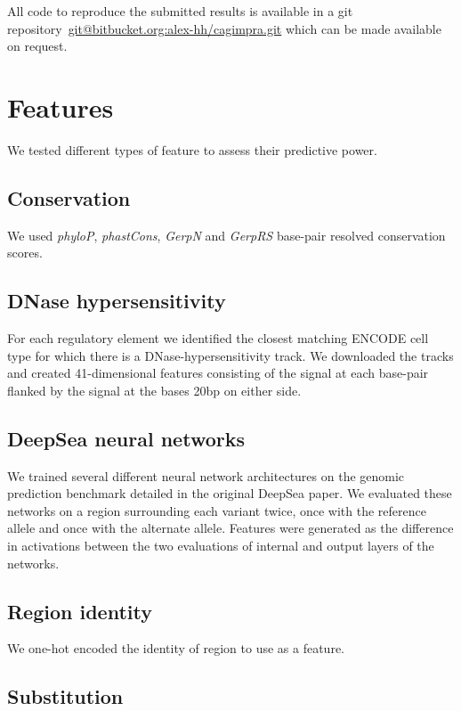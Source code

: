 \documentclass{article}
\begin{document}
All code to reproduce the submitted results is available in a git
repository~\url{git@bitbucket.org:alex-hh/cagimpra.git} which can be made
available on request.


\section*{Features}

We tested different types of feature to assess their predictive power.


\subsection*{Conservation}

We used \emph{phyloP}, \emph{phastCons}, \emph{GerpN} and \emph{GerpRS}
base-pair resolved conservation scores.


\subsection*{DNase hypersensitivity}

For each regulatory element we identified the closest matching ENCODE cell type
for which there is a DNase-hypersensitivity track. We downloaded the tracks and
created 41-dimensional features consisting of the signal at each base-pair
flanked by the signal at the bases 20bp on either side.


\subsection*{DeepSea neural networks}

We trained several different neural network architectures on the genomic
prediction benchmark detailed in the original DeepSea paper. We evaluated these
networks on a region surrounding each variant twice, once with the reference
allele and once with the alternate allele. Features were generated as the
difference in activations between the two evaluations of internal and output
layers of the networks.


\subsection*{Region identity}

We one-hot encoded the identity of region to use as a feature.


\subsection*{Substitution}
\end{document}
